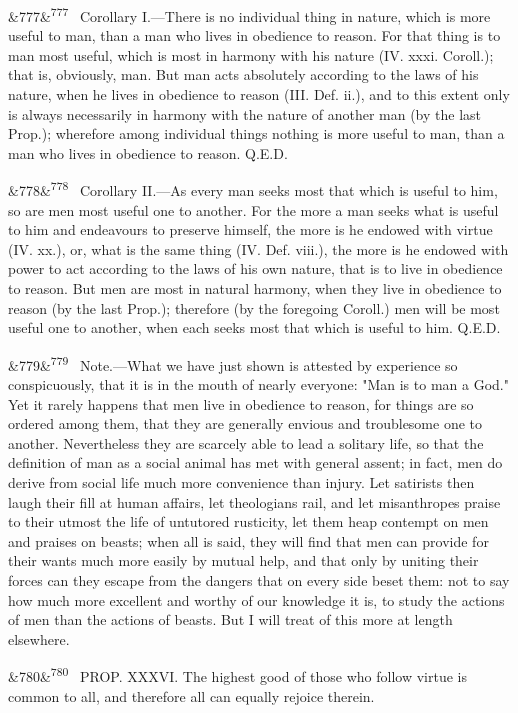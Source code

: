 \documentclass[12pt]{article}
\newcommand{\para}[1][]{\par\noindent\ifx&#1&\else\textsuperscript{\footnotesize #1}~\fi}
\begin{document}
\para[777] Corollary I.---There is no individual thing in nature, which is more useful to man, than a man who lives in obedience to reason. For that thing is to man most useful, which is most in harmony with his nature (IV. xxxi. Coroll.); that is, obviously, man. But man acts absolutely according to the laws of his nature, when he lives in obedience to reason (III. Def. ii.), and to this extent only is always necessarily in harmony with the nature of another man (by the last Prop.); wherefore among individual things nothing is more useful to man, than a man who lives in obedience to reason. Q.E.D.

\para[778] Corollary II.---As every man seeks most that which is useful to him, so are men most useful one to another. For the more a man seeks what is useful to him and endeavours to preserve himself, the more is he endowed with virtue (IV. xx.), or, what is the same thing (IV. Def. viii.), the more is he endowed with power to act according to the laws of his own nature, that is to live in obedience to reason. But men are most in natural harmony, when they live in obedience to reason (by the last Prop.); therefore (by the foregoing Coroll.) men will be most useful one to another, when each seeks most that which is useful to him. Q.E.D.

\para[779] Note.---What we have just shown is attested by experience so conspicuously, that it is in the mouth of nearly everyone: "Man is to man a God." Yet it rarely happens that men live in obedience to reason, for things are so ordered among them, that they are generally envious and troublesome one to another. Nevertheless they are scarcely able to lead a solitary life, so that the definition of man as a social animal has met with general assent; in fact, men do derive from social life much more convenience than injury. Let satirists then laugh their fill at human affairs, let theologians rail, and let misanthropes praise to their utmost the life of untutored rusticity, let them heap contempt on men and praises on beasts; when all is said, they will find that men can provide for their wants much more easily by mutual help, and that only by uniting their forces can they escape from the dangers that on every side beset them: not to say how much more excellent and worthy of our knowledge it is, to study the actions of men than the actions of beasts. But I will treat of this more at length elsewhere.

\para[780] PROP. XXXVI. The highest good of those who follow virtue is common to all, and therefore all can equally rejoice therein.
\end{document}

